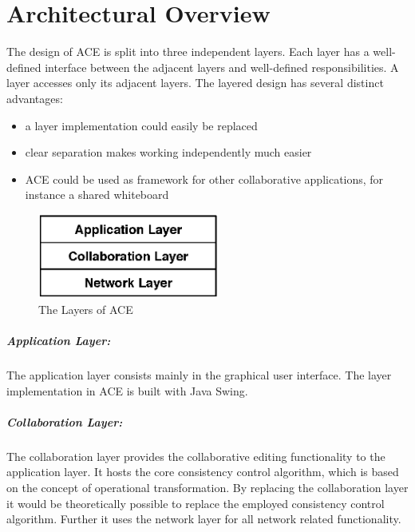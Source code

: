 \chapter{Architectural Overview}
\label{chapter:archoverview}

The design of ACE is split into three independent layers. 
Each layer has a well-defined interface between the adjacent layers and 
well-defined responsibilities. A layer accesses only its adjacent layers.
The layered design has several distinct advantages:

\begin{itemize} 
 \item a layer implementation could easily be replaced
 \item clear separation makes working independently much easier
 \item ACE could be used as framework for other collaborative applications, for instance a shared whiteboard
\end{itemize}


\begin{figure}[H]
 \centering
 \includegraphics[width=5.96cm,height=2.79cm]{../images/finalreport/architecture_layers.eps}
 \caption{The Layers of ACE}
\end{figure}

\paragraph{Application Layer:} The application layer consists mainly in the 
graphical user interface. The layer implementation in ACE is built with
Java Swing.

\paragraph{Collaboration Layer:} The collaboration layer provides the
collaborative editing functionality to the application layer. It hosts the core
consistency control algorithm, which is based on the concept of operational 
transformation. By replacing the collaboration layer it would be theoretically 
possible to replace the employed consistency control algorithm. Further it uses 
the network layer for all network related functionality.


